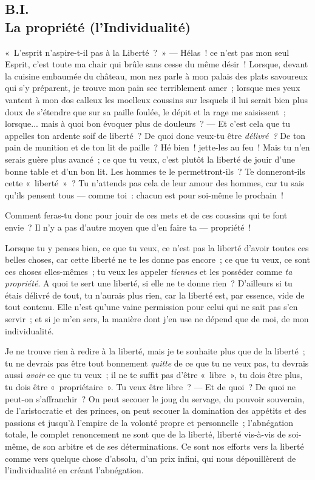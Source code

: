 \documentclass[french,twoside]{book} %
\begin{document}
 \subsection[{B.I. La propriété (l’Individualité)}]{B.I. \\
La propriété (l’Individualité)}
\label{p17}
\noindent « L’esprit n’aspire-t-il pas à la Liberté ? » — Hélas ! ce n’est pas mon seul Esprit, c’est toute ma chair qui brûle sans cesse du même désir ! Lorsque, devant la cuisine embaumée du château, mon nez parle à mon palais des plats savoureux qui s’y préparent, je trouve mon pain sec terriblement amer ; lorsque mes yeux vantent à mon dos calleux les moelleux coussins sur lesquels il lui serait bien plus doux de s’étendre que sur sa paille foulée, le dépit et la rage me saisissent ; lorsque... mais à quoi bon évoquer plus de douleurs ? — Et c’est cela que tu appelles ton ardente soif de liberté ? De quoi donc veux-tu être \emph{délivré ?} De ton pain de munition et de ton lit de paille ? Hé bien ! jette-les au feu ! Mais tu n’en serais guère plus avancé ; ce que tu veux, c’est plutôt la liberté de jouir d’une bonne table et d’un bon lit. Les hommes te le permettront-ils ? Te donneront-ils cette « liberté » ? Tu n’attends pas cela de leur amour des hommes, car tu sais qu’ils pensent tous — comme toi : chacun est pour soi-même le prochain !\par
Comment feras-tu donc pour jouir de ces mets et de ces coussins qui te font envie ? Il n’y a pas d’autre moyen que d’en faire ta — propriété !\par
 Lorsque tu y penses bien, ce que tu veux, ce n’est pas la liberté d’avoir toutes ces belles choses, car cette liberté ne te les donne pas encore ; ce que tu veux, ce sont ces choses elles-mêmes ; tu veux les appeler \emph{tiennes} et les posséder comme \emph{ta propriété}. A quoi te sert une liberté, si elle ne te donne rien ? D’ailleurs si tu étais délivré de tout, tu n’aurais plus rien, car la liberté est, par essence, vide de tout contenu. Elle n’est qu’une vaine permission pour celui qui ne sait pas s’en servir ; et si je m’en sers, la manière dont j’en use ne dépend que de moi, de mon individualité.\par
Je ne trouve rien à redire à la liberté, mais je te souhaite plus que de la liberté ; tu ne devrais pas être tout bonnement \emph{quitte} de ce que tu ne veux pas, tu devrais aussi \emph{avoir} ce que tu veux ; il ne te suffit pas d’être « libre », tu dois être plus, tu dois être « propriétaire ». Tu veux être libre ? — Et de quoi ? De quoi ne peut-on s’affranchir ? On peut secouer le joug du servage, du pouvoir souverain, de l’aristocratie et des princes, on peut secouer la domination des appétits et des passions et jusqu’à l’empire de la volonté propre et personnelle ; l’abnégation totale, le complet renoncement ne sont que de la liberté, liberté vis-à-vis de soi-même, de son arbitre et de ses déterminations. Ce sont nos efforts vers la liberté comme vers quelque chose d’absolu, d’un prix infini, qui nous dépouillèrent de l’individualité en créant l’abnégation.\par
\end{document}
